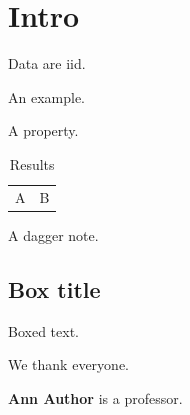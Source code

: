\section{Intro}
\begin{assumption}Data are iid.\end{assumption}
\begin{eexample}An example.\end{eexample}
\begin{property}A property.\end{property}
\begin{table}
\caption{Results}
\begin{tabular}{ll}
A & B\tnote{$\dagger$} \\
\end{tabular}
\begin{tablenotes}
\item[$\dagger$] A dagger note.
\end{tablenotes}
\end{table}
\begin{boxtext}
\section*{Box title}
Boxed text.
\end{boxtext}
\begin{ack}[Acknowledgements]
We thank everyone.
\end{ack}
\begin{biography}{}{\textbf{Ann Author} is a professor.}
\end{biography}

